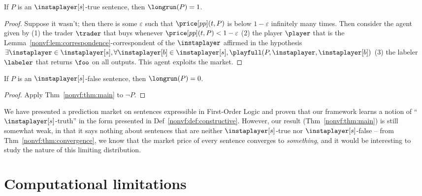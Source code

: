 \begin{theorem}
    If $P$ is an $\instaplayer[s]$-true sentence, then $\longrun(P)=1$.
    \label{nonvf:thm:main}
\end{theorem}
\begin{proof}
    Suppose it wasn't; then there is some $\varepsilon$ such that $\price[pp](t,P)$ is below $1-\varepsilon$ infinitely many times. Then consider the agent given by (1) the trader $\trader$ that buys whenever $\price[pp](t,P)<1-\varepsilon$ (2) the player $\player$ that is the Lemma~\ref{nonvf:lem:correspondence}-correspondent of the $\instaplayer$ affirmed in the hypothesis $\exists\instaplayer\in\instaplayer[s],\forall\instaplayer[b]\in\instaplayer[s],\playfull(P,\instaplayer,\instaplayer[b])$ (3) the labeler $\labeler$ that returns $\foo$ on all outputs. This agent exploits the market.
\end{proof}

\begin{corollary}
    If $P$ is an $\instaplayer[s]$-false sentence, then $\longrun(P)=0$.
    \label{nonvf:cor:main}
\end{corollary}
\begin{proof}
    Apply Thm~\ref{nonvf:thm:main} to $\lnot P$.
\end{proof}

We have presented a prediction market on sentences expressible in First-Order Logic and proven that our framework learns a notion of ``$\instaplayer[s]$-truth'' in the form presented in Def~\ref{nonvf:def:constructive}. However, our result (Thm~\ref{nonvf:thm:main}) is still somewhat weak, in that it says nothing about sentences that are neither $\instaplayer[s]$-true nor $\instaplayer[s]$-false -- from Thm~\ref{nonvf:thm:convergence}, we know that the market price of every sentence converges to \emph{something}, and it would be interesting to study the nature of this limiting distribution.

\section{Computational limitations}
\label{nonvf:sec:complexity}

